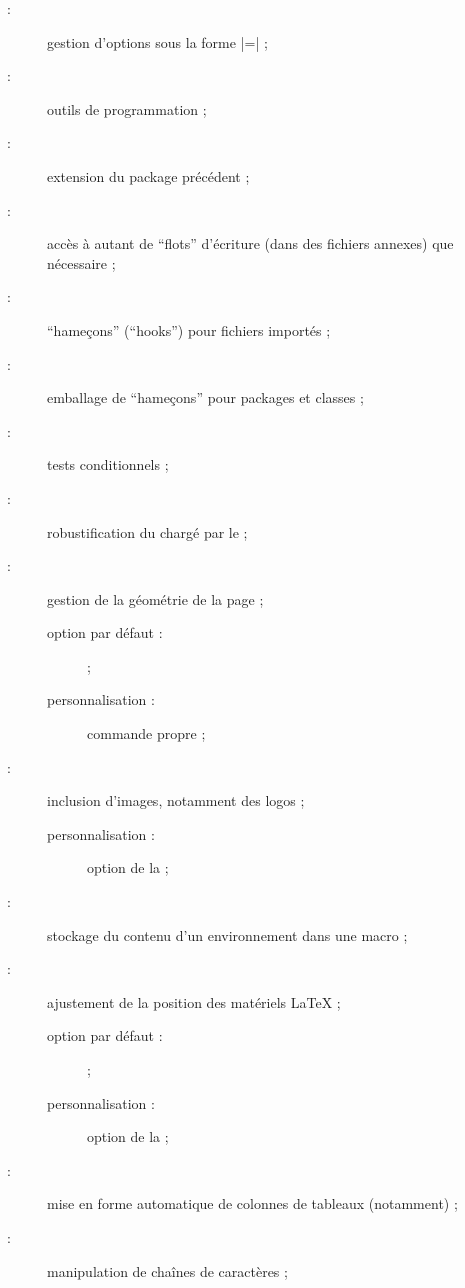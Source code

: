 \begin{description}
\item[ :] gestion d'options sous la forme
  |=| ;
\item[ :] outils de programmation ;
\item[ :] extension du package précédent ;
\item[ :] accès à autant de \enquote{flots} d'écriture
  (dans des fichiers annexes) que nécessaire ;
\item[ :] \enquote{hameçons} (\foreignquote{english}{hooks})
  pour fichiers importés ;
\item[ :] emballage de \enquote{hameçons} pour packages et
  classes ;
\item[ :] tests conditionnels ;
\item[ :] robustification du  chargé par le
   ;
\item[ :] gestion de la géométrie de la page ;
  \begin{description}
  \item[option par défaut :]  ;
  \item[personnalisation :] commande propre  ;
  \end{description}
\item[ :] inclusion d'images, notamment des logos ;
  \begin{description}
  \item[personnalisation :] option  de la \yatcl ;
  \end{description}
\item[ :] stockage du contenu d'un environnement dans une
  macro ;
\item[ :] ajustement de la position des matériels
  \LaTeX{} ;
  \begin{description}
  \item[option par défaut :]  ;
  \item[personnalisation :] option  de la \yatcl ;
  \end{description}
\item[ :] mise en forme automatique de colonnes de tableaux
  (notamment) ;
\item[ :] manipulation de chaînes de caractères ;

\end{description}

